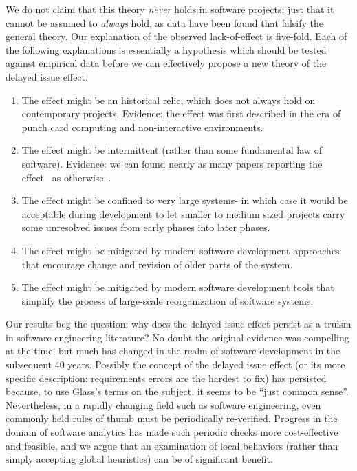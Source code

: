 \documentclass[smallcondensed]{svjour3}
\newcommand{\be}{\begin{enumerate}}
\newcommand{\ee}{\end{enumerate}}
\begin{document}
We do not claim that this theory {\em never} holds in software projects; just that it cannot be assumed to {\em always} hold, as data have been found that falsify the general theory. Our explanation of the observed lack-of-effect is five-fold. Each of the following explanations is essentially a hypothesis which should be tested against empirical data before we can effectively propose a new theory of the delayed issue effect.
\be
\item The effect might be an historical relic, which does not always hold on contemporary projects. Evidence:
the effect was first described in the era of punch card computing and non-interactive environments.
\item The effect might be intermittent (rather than some fundamental law of software). Evidence: we can  found nearly
as many papers reporting the effect~\cite{Boehm76,Boehm81,steck04,Fagan76,Stephenson76} as otherwise~\cite{Royce98,Boehm80,Shull02}.
\item The effect might be confined to very large systems- in which case it would be
acceptable during development to let smaller to medium
sized projects carry some unresolved issues from early phases into later phases.
\item The effect might be mitigated by modern software development approaches that
encourage change and revision of older parts of the system.
\item The effect might be mitigated by modern software development tools
that simplify the process of large-scale reorganization of software systems.
\ee
  
Our results beg the question: why does the delayed issue effect persist as a truism in software engineering literature? No doubt the original evidence was compelling at the time, but much has changed in the realm of software development in the subsequent 40 years. Possibly the concept of the delayed issue effect (or its more specific description: requirements errors are the hardest to fix)
has persisted because, to use Glass's terms on the subject, it seems to be ``just common sense''\cite{glass02}. 
Nevertheless, in a rapidly changing field such as software engineering, even commonly held rules of thumb must be periodically re-verified. 
Progress in the domain of software analytics has made such periodic checks more cost-effective and feasible, and we argue that an examination of local behaviors (rather than simply accepting global heuristics) can be of significant benefit.

  
 
\end{document}
